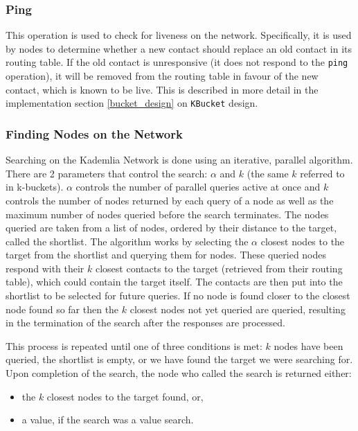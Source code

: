 \documentclass[12pt]{report}
\newcommand{\code}[1]{\colorbox{codegray}{\texttt{#1}}}
\begin{document}
            \subsubsection{Ping}
                This operation is used to check for liveness on the network.
                Specifically, it is used by nodes to determine whether a new
                contact should replace an old contact in its routing table.  If
                the old contact is unresponsive (it does not respond to the
                \code{ping} operation), it will be removed from the routing
                table in favour of the new contact, which is known to be live.
                This is described in more detail in the implementation section
                \ref{bucket_design} on \code{KBucket} design.
            \subsubsection{Finding Nodes on the Network\label{find_nodes}}
            Searching on the Kademlia Network is done using an iterative,
            parallel algorithm. There are 2 parameters that control the search:
            $\alpha$ and $k$ (the same $k$ referred to in k-buckets). $\alpha$
            controls the number of parallel queries active at once and $k$
            controls the number of nodes returned by each query of a node as
            well as the maximum number of nodes queried before the search
            terminates. The nodes queried are taken from a list of nodes,
            ordered by their distance to the target, called the shortlist. The
            algorithm works by selecting the $\alpha$ closest nodes to the
            target from the shortlist and querying them for nodes. These
            queried nodes respond with their $k$ closest contacts to the target
            (retrieved from their routing table), which could contain the
            target itself. The contacts are then put into the shortlist to be
            selected for future queries. If no node is found closer to the
            closest node found so far then the $k$ closest nodes not yet queried
            are queried, resulting in the termination of the search after the
            responses are processed.
		
		This process is repeated until one of three conditions is met: $k$ nodes
		have been queried, the shortlist is empty, or we have found the target 
		we were searching for. Upon completion of the search, the node who 
		called the search is returned either:
        \begin{itemize}
            \item the $k$ closest nodes to the target found, or,
            \item a value, if the search was a value search.
        \end{itemize}
		
\end{document}

